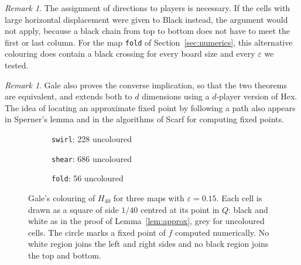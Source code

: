 \documentclass[11pt,a4paper]{amsart}
\theoremstyle{definition}
\theoremstyle{remark}
\newtheorem{remark}[theorem]{Remark}
\newcommand{\Q}{Q}
\newcommand{\eps}{\varepsilon}
\begin{document}
\begin{remark}
The assignment of directions to players is necessary. If the cells with large horizontal displacement were given to Black instead, the argument would not apply, because a black chain from top to bottom does not have to meet the first or last column. For the map \texttt{fold} of Section~\ref{sec:numerics}, this alternative colouring does contain a black crossing for every board size and every $\eps$ we tested.
\end{remark}

\begin{remark}
Gale \cite{gale} also proves the converse implication, so that the two theorems are equivalent, and extends both to $d$ dimensions using a $d$-player version of Hex. The idea of locating an approximate fixed point by following a path also appears in Sperner's lemma and in the algorithms of Scarf \cite{scarf} for computing fixed points.
\end{remark}

\begin{figure}[t]
  \centering
  \begin{subfigure}[b]{0.32\textwidth}
    \centering
    \begin{tikzpicture}[x=0.75cm,y=0.75cm]\end{tikzpicture}
    \caption{\texttt{swirl}: 228 uncoloured}
  \end{subfigure}\hfill
  \begin{subfigure}[b]{0.32\textwidth}
    \centering
    \begin{tikzpicture}[x=0.75cm,y=0.75cm]\end{tikzpicture}
    \caption{\texttt{shear}: 686 uncoloured}
  \end{subfigure}\hfill
  \begin{subfigure}[b]{0.32\textwidth}
    \centering
    \begin{tikzpicture}[x=0.75cm,y=0.75cm]\end{tikzpicture}
    \caption{\texttt{fold}: 56 uncoloured}
  \end{subfigure}
  \caption{Gale's colouring of $H_{40}$ for three maps with $\eps = 0.15$. Each cell is drawn as a square of side $1/40$ centred at its point in $\Q$: black and white as in the proof of Lemma~\ref{lem:approx}, grey for uncoloured cells. The circle marks a fixed point of $f$ computed numerically. No white region joins the left and right sides and no black region joins the top and bottom.}\label{fig:gale}
\end{figure}
\end{document}
